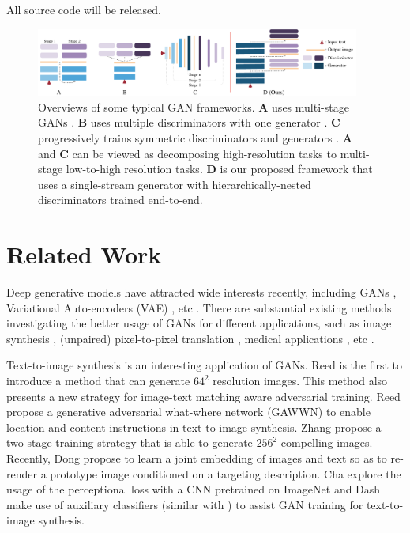 \documentclass[10pt,twocolumn,letterpaper]{article}
\begin{document}
All source code will be released.


\begin{figure}[t]
    \centering
    \includegraphics[width=0.95\textwidth]{figure/views2.pdf}
    \vspace{-.2cm}
    \caption{Overviews of some typical GAN frameworks. \textbf{A} uses multi-stage GANs \cite{han2017stackgan,denton2015deep}. \textbf{B} uses multiple discriminators with one generator \cite{durugkar2016generative,tu_etal_nips17_d2gan}. \textbf{C} progressively trains symmetric discriminators and generators \cite{Karras2017progressive,huang2016stacked}. \textbf{A} and \textbf{C} can be viewed as decomposing high-resolution tasks to multi-stage low-to-high resolution tasks.  \textbf{D} is our proposed framework that uses a single-stream generator with hierarchically-nested discriminators trained end-to-end.} \label{fig:archs-review} \vspace{-.4cm}
\end{figure}


\section{Related Work}

Deep generative models have attracted wide interests recently, including GANs \cite{goodfellow2014generative,radford2015unsupervised}, Variational Auto-encoders (VAE) \cite{kingma2013auto}, etc \cite{oord2016pixel}. 
There are substantial existing methods investigating the better usage of GANs for different applications, such as image synthesis \cite{radford2015unsupervised, shrivastava2016learning}, (unpaired) pixel-to-pixel translation \cite{isola2016image,zhu2017unpaired}, medical applications \cite{costa2017towards}, etc \cite{ledig2016photo,huang2016stacked}.

Text-to-image synthesis is an interesting application of GANs. Reed \etal \cite{reed2016generative} is the first to introduce a method that can generate $64^2$ resolution images. This method also presents a new strategy for image-text matching aware adversarial training. Reed \etal \cite{reed2016learning} propose a generative
adversarial what-where network (GAWWN) to enable location and content instructions in text-to-image synthesis. Zhang \etal \cite{han2017stackgan} propose a two-stage training strategy that is able to generate $256^2$ compelling images. Recently, Dong \etal \cite{dong2017semantic} propose to learn a joint embedding of images and text so as to re-render a prototype image conditioned on a targeting description. Cha \etal \cite{char2017perceptual} explore the usage of the perceptional loss \cite{johnson2016perceptual} with a CNN pretrained on ImageNet  and Dash \etal \cite{dash2017tac} make use of auxiliary classifiers (similar with \cite{odena2016conditional}) to assist GAN training for text-to-image synthesis. 
    
\end{document}
